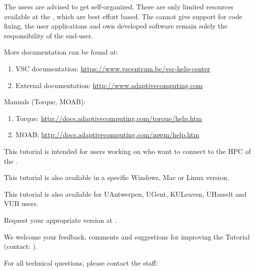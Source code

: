  The users are advised to get self-organized. There are
only limited resources available at the \hpc, which are best effort based.
The \hpc cannot give support for code fixing, the user applications and own
developed software remain solely the responsibility of the end-user.

More documentation can be found at:

\begin{enumerate}
  \item  VSC documentation: \url{https://www.vscentrum.be/vsc-help-center}
  \item  External documentation: \url{http://www.adaptivecomputing.com}
\end{enumerate}

Manuals (Torque, MOAB):

\begin{enumerate}
  \item  Torque: \url{http://docs.adaptivecomputing.com/torque/help.htm}
  \item  MOAB: \url{http://docs.adaptivecomputing.com/mwm/help.htm}
\end{enumerate}

This tutorial \strong{(\version)} is intended for users working on \strong{\OS} who want to connect to the HPC of the \strong{\university}.

This tutorial is also available in a specific Windows, Mac or Linux version.

This tutorial is also available for UAntwerpen, UGent, KULeuven, UHasselt and VUB users.

Request your appropriate version at \hpcinfo.


We welcome your feedback, comments and suggestions for improving the \hpc
Tutorial  (contact: \hpcinfo).

For all technical questions, please contact the \hpc staff:


